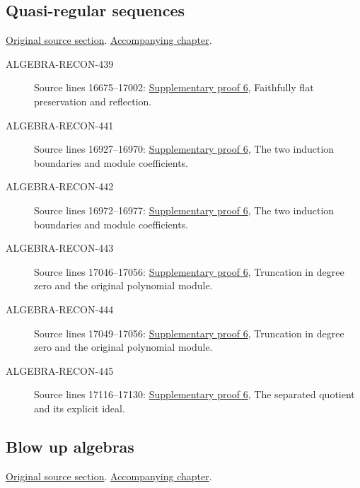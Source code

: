\subsection{Quasi-regular sequences}
\hypertarget{algebra-source-section-quasi-regular}{}
\noindent\href{https://github.com/stacks/stacks-project/blob/a04446e57ec1fbc252a871afcec7752fb2807b14/algebra.tex\#L16855}{Original source section}. \href{algebra.pdf\#nameddest=section-quasi-regular}{Accompanying chapter}.

\begin{description}
\item[ALGEBRA-RECON-439] Source lines 16675--17002: \hyperlink{algebra_embedded_regular_notes_20260927}{Supplementary proof 6}, Faithfully flat preservation and reflection.
\item[ALGEBRA-RECON-441] Source lines 16927--16970: \hyperlink{algebra_embedded_regular_notes_20260927}{Supplementary proof 6}, The two induction boundaries and module coefficients.
\item[ALGEBRA-RECON-442] Source lines 16972--16977: \hyperlink{algebra_embedded_regular_notes_20260927}{Supplementary proof 6}, The two induction boundaries and module coefficients.
\item[ALGEBRA-RECON-443] Source lines 17046--17056: \hyperlink{algebra_embedded_regular_notes_20260927}{Supplementary proof 6}, Truncation in degree zero and the original polynomial module.
\item[ALGEBRA-RECON-444] Source lines 17049--17056: \hyperlink{algebra_embedded_regular_notes_20260927}{Supplementary proof 6}, Truncation in degree zero and the original polynomial module.
\item[ALGEBRA-RECON-445] Source lines 17116--17130: \hyperlink{algebra_embedded_regular_notes_20260927}{Supplementary proof 6}, The separated quotient and its explicit ideal.
\end{description}

\subsection{Blow up algebras}
\hypertarget{algebra-source-section-blow-up}{}
\noindent\href{https://github.com/stacks/stacks-project/blob/a04446e57ec1fbc252a871afcec7752fb2807b14/algebra.tex\#L17136}{Original source section}. \href{algebra.pdf\#nameddest=section-blow-up}{Accompanying chapter}.

